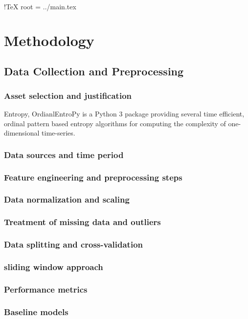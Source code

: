 !TeX root = ../main.tex

\chapter{Methodology}\label{chapter:methodology}

\section{Data Collection and Preprocessing}

\subsection{Asset selection and justification}
Entropy, OrdianlEntroPy is a Python 3 package providing several time efficient, ordinal pattern based entropy algorithms for computing the complexity of one-dimensional time-series.
\subsection{Data sources and time period}
\subsection{Feature engineering and preprocessing steps}
\subsection{Data normalization and scaling}
\subsection{Treatment of missing data and outliers}
\subsection{Data splitting and cross-validation}
\subsection{sliding window approach}

\subsection{Performance metrics}
\subsection{Baseline models}
